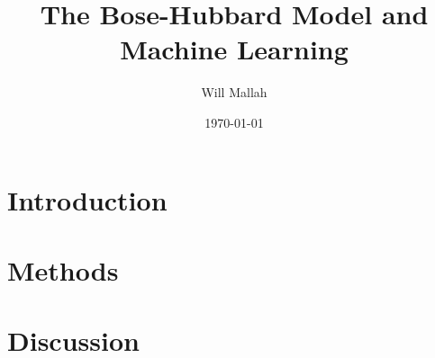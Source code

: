\documentclass[
    reprint,
    lengthcheck,
    amsmath, amssymb,
    aps, onecolumn,
    floatfix
]{revtex4-2}
\begin{document}

\title{The Bose-Hubbard Model and Machine Learning}

\author{Will Mallah}

\date{\today}

\begin{abstract}
    
\end{abstract}

\maketitle

\section{Introduction}


\section{Methods}


\section{Discussion}


\nocite{*}
\end{document}
